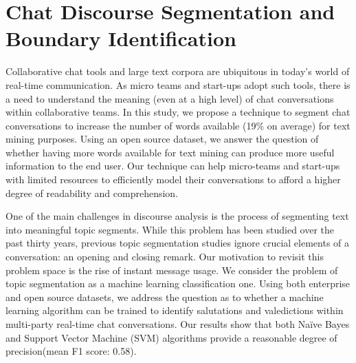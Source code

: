 
\chapter{Chat Discourse Segmentation and Boundary Identification} %
\label{ch:TM}

\begin{textsl}
{\small Collaborative chat tools and large text corpora are ubiquitous in today's world of real-time communication. As micro teams and start-ups adopt such tools, there is a need to understand the meaning (even at a high level) of chat conversations within collaborative teams. In this study, we propose a technique to segment chat conversations to increase the number of words available (19\% on average) for text mining purposes. Using an open source dataset, we answer the question of whether having more words available for text mining can produce more useful information to the end user. Our technique can help micro-teams and start-ups with limited resources to efficiently model their conversations to afford a higher degree of readability and comprehension.

One of the main challenges in discourse analysis is the process of segmenting text into meaningful topic segments. While this problem has been studied over the past thirty years, previous topic segmentation studies ignore crucial elements of a conversation: an opening and closing remark. Our motivation to revisit this problem space is the rise of instant message usage. We consider the problem of topic segmentation as a machine learning classification one. Using both enterprise and open source datasets, we address the question as to whether a machine learning algorithm can be trained to identify salutations and valedictions within multi-party real-time chat conversations. Our results show that both Na\"ive Bayes and Support Vector Machine (SVM) algorithms provide a reasonable degree of precision(mean F1 score: 0.58).}
\end{textsl}

\vspace*{1cm}




